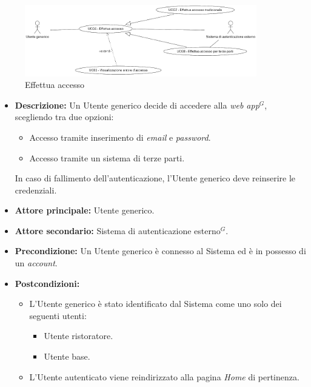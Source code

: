 \label{usecase:Effettua accesso}

\begin{figure}[h]
	\centering
	\includegraphics[width=0.9\textwidth]{./uml/UCG6-7-8.png} 
	\caption{Effettua accesso}
	\label{fig:UCG6-7-8}
  \end{figure}

\begin{itemize}
	\item \textbf{Descrizione:} Un Utente generico decide di accedere alla \textit{web app$^G$}, scegliendo tra due opzioni:
	\begin{itemize}
		\item Accesso tramite inserimento di \textit{email} e \textit{password}.
		\item Accesso tramite un sistema di terze parti.
	\end{itemize}
	In caso di fallimento dell'autenticazione, l'Utente generico deve reinserire le credenziali.

	\item \textbf{Attore principale:} Utente generico.
	\item \textbf{Attore secondario:} Sistema di autenticazione esterno$^G$.
	\item \textbf{Precondizione:}
	      Un Utente generico è connesso al Sistema ed è in possesso di un \textit{account}.

	\item \textbf{Postcondizioni:}
		\begin{itemize}      
			\item L'Utente generico è stato identificato dal Sistema come uno solo dei seguenti utenti:
	      		\begin{itemize}
		      		\item Utente ristoratore.
		      		\item Utente base.
	      		\end{itemize}
		  	\item L'Utente autenticato viene reindirizzato alla pagina \textit{Home} di pertinenza.
		\end{itemize}


\end{itemize}
